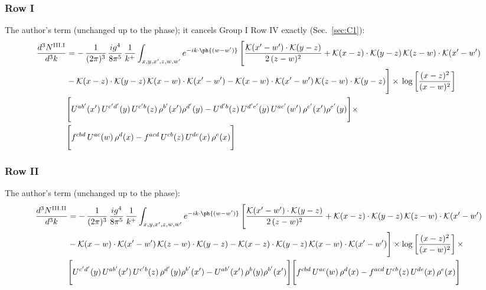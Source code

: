 \subsubsection*{Row I}
The author's term (unchanged up to the phase); it cancels Group I Row IV exactly (Sec.~\ref{sec:C1}):
\begin{align}
\frac{d^{3}N^{\rm III.I}}{d^{3}k} & = -\,\frac{1}{(2\pi)^{3}}\,\frac{ig^{4}}{8\pi^{5}}\,\frac{1}{k^{+}}\int_{x,y,x',z,w,w'} e^{-ik\cdot\ph{(w-w')}}\,\Bigg[\frac{\mathcal{K}(x'-w')\cdot\mathcal{K}(y-z)}{2\,(z-w)^{2}}+\mathcal{K}(x-z)\cdot\mathcal{K}(y-z)\,\mathcal{K}(z-w)\cdot\mathcal{K}(x'-w')\notag \\
& -\mathcal{K}(x-z)\cdot\mathcal{K}(y-z)\,\mathcal{K}(x-w)\cdot\mathcal{K}(x'-w')-\mathcal{K}(x-w)\cdot\mathcal{K}(x'-w')\,\mathcal{K}(z-w)\cdot\mathcal{K}(y-z)\Bigg]\times\, \log\left[\frac{(x-z)^{2}}{(x-w)^{2}}\right]\notag \\
& \Bigg[U^{ab'}(x')\,U^{c'd'}(y)\,U^{c'b}(z)\,\rho^{b'}(x')\rho^{d'}(y)-U^{d'b}(z)\,U^{d'e'}(y)\,U^{ac'}(w')\,\rho^{c'}(x')\rho^{e'}(y)\Bigg]\times\notag \\ & \Bigg[f^{cbd}\,U^{ac}(w)\,\rho^{d}(x)-f^{acd}\, U^{cb}(z)\,U^{de}(x)\,\rho^{e}(x)\Bigg]\label{eq:B-III1}
\end{align}
\subsubsection*{Row II}
The author's term (unchanged up to the phase):
\begin{align}
\frac{d^{3}N^{\rm III.II}}{d^{3}k} & = -\,\frac{1}{(2\pi)^{3}}\,\frac{ig^{4}}{8\pi^{5}}\,\frac{1}{k^{+}}\int_{x,y,x',z,w,w'} e^{-ik\cdot\ph{(w-w')}}\,\Bigg[\frac{\mathcal{K}(x'-w')\cdot\mathcal{K}(y-z)}{2\,(z-w)^{2}} +\mathcal{K}(x-z)\cdot\mathcal{K}(y-z)\,\mathcal{K}(z-w)\cdot\mathcal{K}(x'-w')\notag \\ & -\mathcal{K}(x-w)\cdot\mathcal{K}(x'-w')\,\mathcal{K}(z-w)\cdot\mathcal{K}(y-z)-\mathcal{K}(x-z)\cdot\mathcal{K}(y-z)\,\mathcal{K}(x-w)\cdot\mathcal{K}(x'-w')\Bigg]\times\log\left[\frac{(x-z)^{2}}{(x-w)^{2}}\right]\times\notag \\
&\Bigg[U^{c'd'}(y)\,U^{ab'}(x')\,U^{c'b}(z)\,\rho^{d'}(y)\rho^{b'}(x')-U^{ab'}(x')\,\rho^{b}(y)\rho^{b'}(x')\Bigg]\Bigg[f^{cbd}\,U^{ac}(w)\,\rho^{d}(x)-f^{acd}\, U^{cb}(z)\,U^{de}(x)\,\rho^{e}(x)\Bigg]\label{eq:B-III2}
\end{align}
